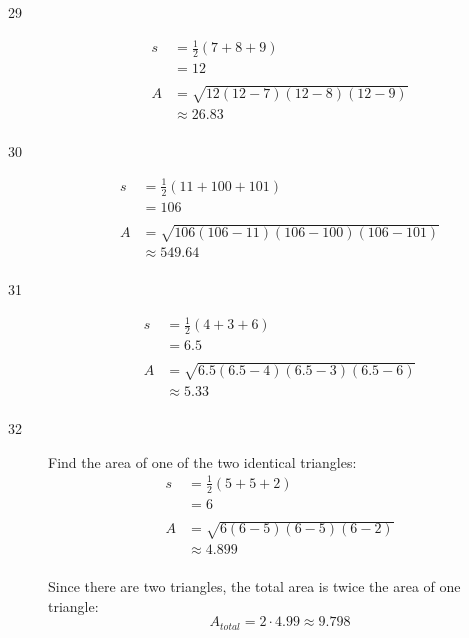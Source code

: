 \documentclass{exam}
\begin{document}
\begin{description}
      \item[29]
        \begin{align*}
          s  & = \frac{1}{2}(7 + 8 + 9) \\
             & = 12 \\
          \\
          A  & = \sqrt{12 (12 - 7)(12 - 8) (12 - 9)} \\
             & \approx \boxed{ 26.83 } \\
        \end{align*}

      \item[30]
        \begin{align*}
          s  & = \frac{1}{2}(11 + 100 + 101) \\
             & = 106 \\
          \\
          A  & = \sqrt{106 (106 - 11)(106 - 100) (106 - 101)} \\
             & \approx \boxed{ 549.64 } \\
        \end{align*}

      \item[31]
        \begin{align*}
          s  & = \frac{1}{2}(4 + 3 + 6) \\
             & = 6.5 \\
          \\
          A  & = \sqrt{6.5 (6.5 - 4)(6.5 - 3) (6.5 - 6)} \\
             & \approx \boxed{ 5.33 } \\
        \end{align*}

      \item[32]
        Find the area of one of the two identical triangles:
        \begin{align*}
          s  & = \frac{1}{2}(5 + 5 + 2) \\
             & = 6 \\
          \\
          A  & = \sqrt{6 (6 - 5)(6 - 5) (6 - 2)} \\
             & \approx 4.899 \\
        \end{align*}

        Since there are two triangles, the total area is twice the area of one triangle: 
        \[
          A_{total} = 2 \cdot 4.99 \approx \boxed{ 9.798 }
        \]


\end{description}
\end{document}
